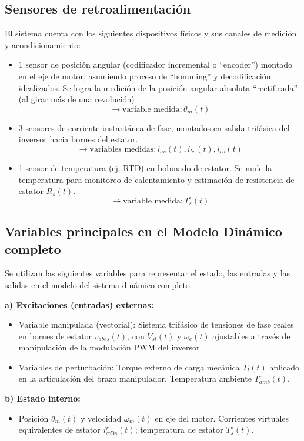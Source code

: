 \documentclass[a4paper, 10pt, onecolumn,journal]{ieeeconf}
\begin{document}
\subsection{\textbf{Sensores de retroalimentación}}

El sistema cuenta con los siguientes dispositivos físicos y sus canales de medición y acondicionamiento:
\begin{itemize}
    \item 1 sensor de posición angular (codificador incremental o “encoder”) montado en el eje de motor, asumiendo proceso de “homming” y decodificación idealizados. Se logra la medición de la posición angular absoluta “rectificada” (al girar más de una revolución)
    \[\rightarrow \text{variable medida}: \theta_m(t)\]
    \item 3 sensores de corriente instantánea de fase, montados en salida trifásica del inversor hacia bornes del estator.
    \[\rightarrow \text{variables medidas}: i_{as}(t), i_{bs}(t), i_{cs}(t)\]
    \item 1 sensor de temperatura (ej. RTD) en bobinado de estator. Se mide la temperatura para monitoreo de calentamiento y estimación de resistencia de estator $R_s(t)$.
    \[\rightarrow \text{variable medida}: T_s^{\circ}(t)\]
\end{itemize}

\subsection{\textbf{Variables principales en el Modelo Dinámico completo}}
Se utilizan las siguientes variables para representar el estado, las entradas y las salidas en el modelo del sistema dinámico completo.

\textbf{a) Excitaciones (entradas) externas:}
\begin{itemize}
    \item Variable manipulada (vectorial): Sistema trifásico de tensiones de fase reales en bornes de estator $v_{abcs}(t)$, con $V_{sl}(t)$ y $\omega_e(t)$ ajustables a través de manipulación de la modulación PWM del inversor.
    \item Variables de perturbación: Torque externo de carga mecánica $T_l(t)$ aplicado en la articulación del brazo manipulador. Temperatura ambiente $T_{amb}^{\circ}(t)$.
\end{itemize}

\textbf{b) Estado interno:}
\begin{itemize}
    \item Posición $\theta_m(t)$ y velocidad $\omega_m(t)$ en eje del motor. Corrientes virtuales equivalentes de estator $i_{qd0s}^r(t)$; temperatura de estator $T_s^{\circ}(t)$.
\end{itemize}
\end{document}
